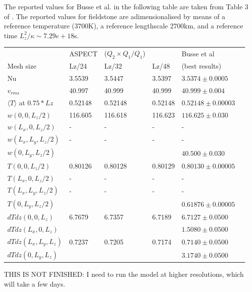 The reported values for Busse et al. in the following table are taken from Table 3 of \cite{bucc93}.
The reported values for fieldstone are adimensionalised by means of a reference temperature (3700K),
a reference lengthscale 2700km, and a reference time $L_z^2/\kappa\sim 7.29e+18$s.



\begin{tabular}{llllll}
\hline
                                & ASPECT & ($Q_2\times Q_1/Q_1$)      &       & Busse et al \cite{bucc93} &  \\
Mesh size                       & Lz/24  & Lz/32 & Lz/48 & (best results)            & \\ 
\hline
Nu                              & 3.5539 &3.5447 & 3.5397 & $3.5374  \pm 0.0005$   \\
$v_{rms}$                       & 40.997 &40.999 &40.999  & $40.999  \pm 0.004$    \\
$\langle T\rangle$ at $0.75*Lz$ & 0.52148 & 0.52148&0.52148  & $0.52148 \pm 0.00003$  \\
$w(0,0,L_z/2)$     & 116.605 & 116.618 &  116.623  & $116.625 \pm 0.030$ \\
$w(L_x,0,L_z/2)$   & - &-&-& -\\
$w(L_x,L_y,L_z/2)$ & - &-&-& -\\
$w(0,L_y,L_z/2)$   &  &&& $40.500 \pm 0.030$ \\

$T(0,0,L_z/2)$     &  0.80126 & 0.80128 & 0.80129 & $0.80130 \pm 0.00005$ \\
$T(L_x,0,L_z/2)$   &  -&-&-& -\\
$T(L_x,L_y,L_z/2)$ &  -&-&-& -\\
$T(0,L_y,L_z/2)$   &  &&& $0.61876 \pm 0.00005$ \\
$dTdz(0,0,L_z)$    & 6.7679 & 6.7357 & 6.7189 & $6.7127 \pm 0.0500$ \\
$dTdz(L_x,0,L_z)$  &  & & & $1.5080 \pm 0.0500$ \\
$dTdz(L_x,L_y,L_z)$& 0.7237 & 0.7205 & 0.7174 & $0.7140 \pm 0.0500$ \\
$dTdz(0,L_y,L_z)$  &  & & & $3.1740 \pm 0.0500$ \\
\hline
\end{tabular}

\vspace{1cm}

THIS IS NOT FINISHED: I need to run the model at higher resolutions, which will take a few days.

